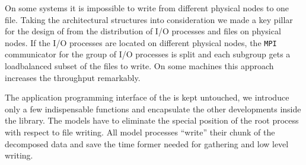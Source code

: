 On some systems it is impossible to write from different physical nodes to one 
file. Taking the architectural structures into consideration we made a key 
pillar for the design of {\pio} from the distribution of I/O processes and files 
on physical nodes. If the I/O processes are located on different physical nodes, 
the {\tt MPI} communicator for the group of I/O processes is split and each 
subgroup gets a loadbalanced subset of the files to write. On some machines 
this approach increases the throughput remarkably.
\smallskip 

The application programming interface of the {\CDI} is kept untouched, 
we introduce only a few indispensable functions and encapsulate the other 
developments inside the library. The models have to eliminate the special 
position of the root process with respect to file writing. All model processes 
``write'' their chunk of the decomposed data and save the time former needed 
for gathering and low level writing. 